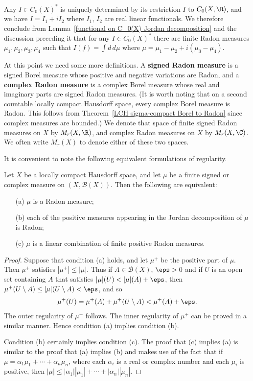 Any $I\in C_0(X)^*$ is uniquely determined by its restriction $I$ to $C_0(X,\R)$, and we have $I=I_1+iI_2$ where $I_1$, $I_2$ are real linear functionals. We therefore conclude from Lemma~\ref{functional on C_0(X) Jordan decomposition} and the discussion preceding it that for any $I\in C_0(X)^*$ there are finite Radon measures $\mu_1,\mu_2,\mu_3,\mu_4$ such that $I(f)=\int d\,d\mu$ where $\mu=\mu_1-\mu_2+i(\mu_3-\mu_4)$.\par
At this point we need some more definitions. A \textbf{signed Radon measure} is a signed Borel measure whose positive and negative variations are Radon, and a \textbf{complex Radon measure} is a complex Borel measure whose real and imaginary parts are signed Radon measures. (It is worth noting that on a second countable locally compact Hausdorff space, every complex Borel measure is Radon. This follows from Theorem~\ref{LCH sigma-compact Borel to Radon} since complex measures are bounded.) We denote that space of finite signed Radon measures on $X$ by $M_r(X,\R)$, and complex Radon measures on $X$ by $M_r(X,\C)$. We often write $M_r(X)$ to denote either of these two spaces.\par
It is convenient to note the following equivalent formulations of regularity.
\begin{proposition}
Let $X$ be a locally compact Hausdorff space, and let $\mu$ be a finite signed or complex measure on $(X,\mathcal{B}(X))$. Then the following are equivalent:
\begin{itemize}
\item[(a)] $\mu$ is a Radon measure;
\item[(b)] each of the positive measures appearing in the Jordan decomposition of $\mu$ is Radon;
\item[(c)] $\mu$ is a linear combination of finite positive Radon measures.
\end{itemize}
\end{proposition}
\begin{proof}
Suppose that condition (a) holds, and let $\mu^+$ be the positive part of $\mu$. Then $\mu^+$ satisfies $|\mu^+|\leq|\mu|$. Thus if $A\in\mathcal{B}(X)$, $\eps>0$ and if $U$ is an open set containing $A$ that satisfies $|\mu|(U)<|\mu|(A)+\eps$, then $\mu^+(U\setminus A)\leq|\mu|(U\setminus A)<\eps$, and so
\[\mu^+(U)=\mu^+(A)+\mu^+(U\setminus A)<\mu^+(A)+\eps.\]
The outer regularity of $\mu^+$ follows. The inner regularity of $\mu^+$ can be proved in a similar manner. Hence condition (a) implies condition (b).\par
Condition (b) certainly implies condition (c). The proof that (c) implies (a) is similar to the proof that (a) implies (b) and makes use of the fact that if $\mu=\alpha_1\mu_1+\cdots+\alpha_n\mu_n$, where each $\alpha_i$ is a real or complex number and each $\mu_i$ is positive, then $|\mu|\leq|\alpha_1||\mu_1|+\cdots+|\alpha_n||\mu_n|$.
\end{proof}
